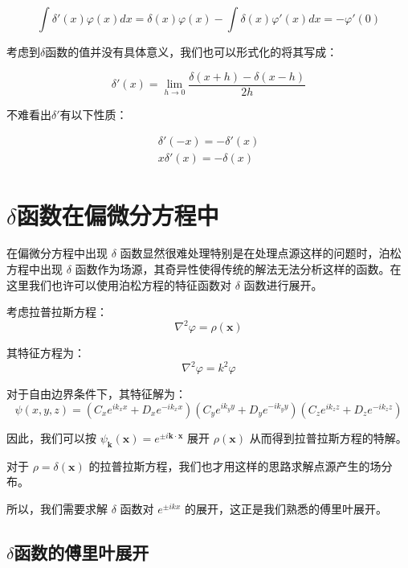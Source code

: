 \documentclass[lang=cn,10pt,newtx,bibend=biber,device=pad]{elegantbook}
\begin{document}
\begin{equation}
\int \delta'(x)\varphi(x)dx = \delta(x)\varphi(x) - \int \delta(x)\varphi'(x)dx = -\varphi'(0)
\end{equation}

考虑到$\delta$函数的值并没有具体意义，我们也可以形式化的将其写成：

\begin{equation}
\delta'(x) = \lim_{h\to0}\frac{\delta(x+h)-\delta(x-h)}{2h}
\end{equation}

不难看出$\delta'$有以下性质：
\begin{property}
\begin{equation}
    \begin{aligned}
\delta'(-x) = -\delta'(x)\\
x\delta'(x) = -\delta(x)
    \end{aligned}
\end{equation}
\end{property}
\section{$\delta$函数在偏微分方程中}
在偏微分方程中出现 $\delta$ 函数显然很难处理特别是在处理点源这样的问题时，泊松方程中出现 $\delta$ 函数作为场源，其奇异性使得传统的解法无法分析这样的函数。在这里我们也许可以使用泊松方程的特征函数对 $\delta$ 函数进行展开。

考虑拉普拉斯方程：
$$\nabla^2\varphi = \rho(\mathbf{x})$$

其特征方程为：
\begin{equation}
\nabla^2\varphi = k^2 \varphi
\end{equation}

对于自由边界条件下，其特征解为：
\begin{equation}
\psi(x, y, z) = (C_x e^{i k_x x} + D_x e^{-i k_x x})(C_y e^{i k_y y} + D_y e^{-i k_y y})(C_z e^{i k_z z} + D_z e^{-i k_z z})
\end{equation}

因此，我们可以按 $\psi_\mathbf{k}(\mathbf{x}) = e^{\pm i\mathbf{k}\cdot\mathbf{x}}$ 展开 $\rho(\mathbf{x})$ 从而得到拉普拉斯方程的特解。

对于 $\rho=\delta(\mathbf{x})$ 的拉普拉斯方程，我们也才用这样的思路求解点源产生的场分布。

所以，我们需要求解 $\delta$ 函数对 $e^{\pm i kx}$ 的展开，这正是我们熟悉的傅里叶展开。

\subsection{$\delta$函数的傅里叶展开}
\end{document}

